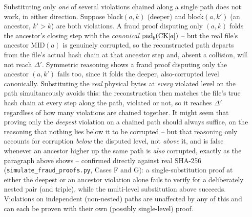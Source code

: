 \begin{remark}
\label{rem:fraud-scope-general}
Substituting only \emph{one} of several violations chained along a single
path does not work, in either direction. Suppose block$(a,k)$ (deeper) and
block$(a,k')$ (an ancestor, $k' > k$) are both violations. A fraud proof
disputing only $(a,k)$ folds the ancestor's closing step with the
\emph{canonical} $\mathrm{pad}_b(\mathrm{CK}[a])$ -- but the real file's ancestor
$\mathrm{MID}(a)$ is genuinely corrupted, so the reconstructed path departs
from the file's actual hash chain at that ancestor step and, absent a
collision, will not reach $\Delta'$. Symmetric reasoning shows a fraud
proof disputing only the ancestor $(a,k')$ fails too, since it folds the
deeper, also-corrupted level canonically. Substituting the \emph{real}
physical bytes at \emph{every} violated level on the path simultaneously
avoids this: the reconstruction then matches the file's true hash chain at
every step along the path, violated or not, so it reaches $\Delta'$
regardless of how many violations are chained together. It might seem
that proving only the \emph{deepest} violation on a chained path should
always suffice, on the reasoning that nothing lies below it to be
corrupted -- but that reasoning only accounts for corruption \emph{below}
the disputed level, not \emph{above} it, and is false whenever an ancestor
higher up the same path is \emph{also} corrupted, exactly as the
paragraph above shows -- confirmed directly against real SHA-256
(\texttt{simulate\_fraud\_proofs.py}, Cases F and G): a single-substitution
proof at either the deepest or an ancestor violation alone fails to verify
for a deliberately nested pair (and triple), while the multi-level
substitution above succeeds. Violations on independent (non-nested) paths
are unaffected by any of this and can each be proven with their own
(possibly single-level) proof.
\end{remark}

